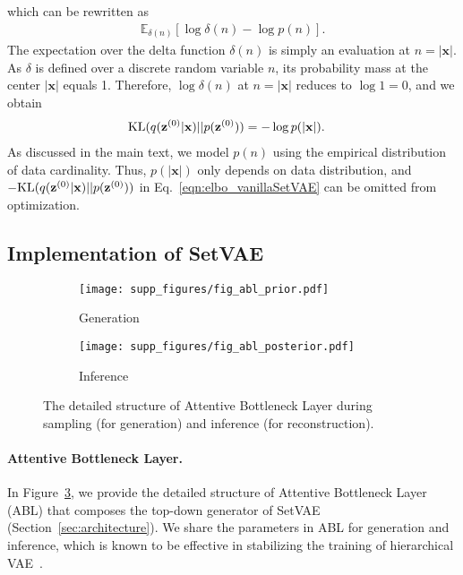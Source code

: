 \documentclass[final]{arxiv/cvpr}
\begin{document}
which can be rewritten as
\begin{align}
    \mathbb{E}_{\delta(n)}{\left[\log{\delta(n)} - \log{p(n)}\right]}.
\end{align}
The expectation over the delta function $\delta(n)$ is simply an evaluation at $n = |\mathbf{x}|$.
As $\delta$ is defined over a discrete random variable $n$, its probability mass at the center $|\mathbf{x}|$ equals 1.
Therefore, $\log{\delta(n)}$ at $n = |\mathbf{x}|$ reduces to $\log1 = 0$, and we obtain
\begin{align}
    \textnormal{KL}&(q(\mathbf{z}^{(0)}|\mathbf{x})||p(\mathbf{z}^{(0)})) = - \log p(|\mathbf{x}|). \label{eqn:kl_constant}
\end{align}
As discussed in the main text, we model $p(n)$ using the empirical distribution of data cardinality.
Thus, $p(|\mathbf{x}|)$ only depends on data distribution, and $- \textnormal{KL}(q(\mathbf{z}^{(0)}|\mathbf{x})||p(\mathbf{z}^{(0)}))$ in Eq.~\eqref{eqn:elbo_vanillaSetVAE} can be omitted from optimization.

\subsection{Implementation of SetVAE}
\label{appendix:abl}

\begin{figure}[!t]
    \centering
    \vspace{0.2in}
    \begin{subfigure}[b]{0.395\linewidth}
        \centering
        \texttt{[image: supp\_figures/fig\_abl\_prior.pdf]}
        \caption{Generation}
        \label{fig:abl_prior}
    \end{subfigure}
    \begin{subfigure}[b]{0.59\linewidth}
        \centering
        \texttt{[image: supp\_figures/fig\_abl\_posterior.pdf]}
        \caption{Inference}
        \label{fig:abl_posterior}
    \end{subfigure}
    \caption{The detailed structure of Attentive Bottleneck Layer during sampling (for generation) and inference (for reconstruction).}
\label{fig:abl_structure}
\end{figure}

\paragraph{Attentive Bottleneck Layer.}
In Figure~\ref{fig:abl_structure}, we provide the detailed structure of Attentive Bottleneck Layer (ABL) that composes the top-down generator of SetVAE (Section~\ref{sec:architecture}).
We share the parameters in ABL for generation and inference, which is known to be effective in stabilizing the training of hierarchical VAE~\cite{kingma2017improving, vahdat2020nvae}.
\end{document}

